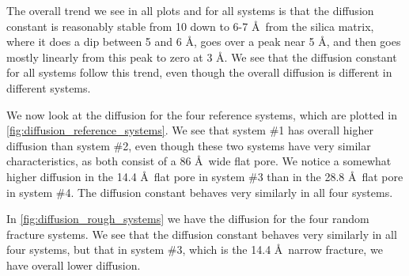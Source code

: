 The overall trend we see in all plots and for all systems is that the diffusion constant is reasonably stable from 10 down to 6-7 \AA\ from the silica matrix, where it does a dip between 5 and 6 \AA, goes over a peak near 5 \AA, and then goes mostly linearly from this peak to zero at 3 \AA. We see that the diffusion constant for all systems follow this trend, even though the overall diffusion is different in different systems.

We now look at the diffusion for the four reference systems, which are plotted in \cref{fig:diffusion_reference_systems}. We see that system \#1 has overall higher diffusion than system \#2, even though these two systems have very similar characteristics, as both consist of a 86 \AA\ wide flat pore. We notice a somewhat higher diffusion in the 14.4 \AA\ flat pore in system \#3 than in the 28.8 \AA\ flat pore in system \#4. The diffusion constant behaves very similarly in all four systems.

In \cref{fig:diffusion_rough_systems} we have the diffusion for the four random fracture systems. We see that the diffusion constant behaves very similarly in all four systems, but that in system \#3, which is the 14.4 \AA\ narrow fracture, we have overall lower diffusion.



